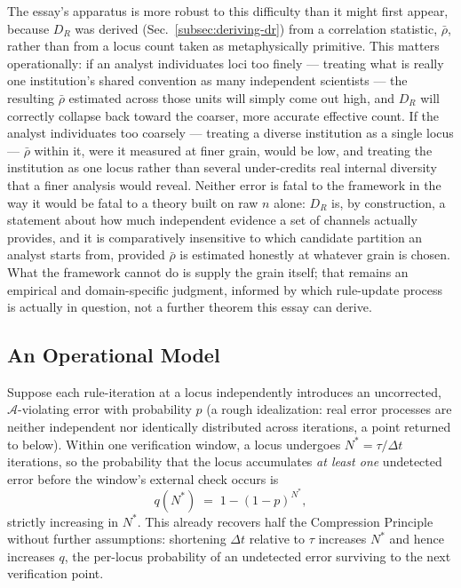 \documentclass[11pt,a4paper]{article}
\theoremstyle{plain}
\theoremstyle{definition}
\theoremstyle{remark}
\newcommand{\Adm}{\mathcal{A}}
\newcommand{\DR}{D_R}
\begin{document}
The essay's apparatus is more robust to this difficulty than it might first appear, because $\DR$ was derived (Sec.~\ref{subsec:deriving-dr}) from a correlation statistic, $\bar\rho$, rather than from a locus count taken as metaphysically primitive. This matters operationally: if an analyst individuates loci too finely — treating what is really one institution's shared convention as many independent scientists — the resulting $\bar\rho$ estimated across those units will simply come out high, and $\DR$ will correctly collapse back toward the coarser, more accurate effective count. If the analyst individuates too coarsely — treating a diverse institution as a single locus — $\bar\rho$ within it, were it measured at finer grain, would be low, and treating the institution as one locus rather than several under-credits real internal diversity that a finer analysis would reveal. Neither error is fatal to the framework in the way it would be fatal to a theory built on raw $n$ alone: $\DR$ is, by construction, a statement about how much independent evidence a set of channels actually provides, and it is comparatively insensitive to which candidate partition an analyst starts from, provided $\bar\rho$ is estimated honestly at whatever grain is chosen. What the framework cannot do is supply the grain itself; that remains an empirical and domain-specific judgment, informed by which rule-update process is actually in question, not a further theorem this essay can derive.

\subsection{An Operational Model}
\label{subsec:operational-risk-model}

Suppose each rule-iteration at a locus independently introduces an uncorrected, $\Adm$-violating error with probability $p$ (a rough idealization: real error processes are neither independent nor identically distributed across iterations, a point returned to below). Within one verification window, a locus undergoes $N^\ast = \tau/\Delta t$ iterations, so the probability that the locus accumulates \emph{at least one} undetected error before the window's external check occurs is
\[
q(N^\ast) \;=\; 1 - (1-p)^{N^\ast},
\]
strictly increasing in $N^\ast$. This already recovers half the Compression Principle without further assumptions: shortening $\Delta t$ relative to $\tau$ increases $N^\ast$ and hence increases $q$, the per-locus probability of an undetected error surviving to the next verification point.
\end{document}

